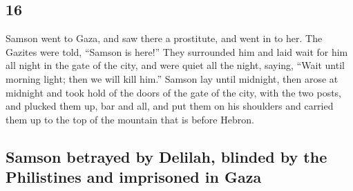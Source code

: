 \begin{paracol}{2}
\begin{otherlanguage}{english}
\hypertarget{section-31}{%
\section{16}\label{section-31}}

 Samson went to Gaza, and saw there a prostitute, and went
in to her.  The Gazites were told, ``Samson is here!''
They surrounded him and laid wait for him all night in the gate of the
city, and were quiet all the night, saying, ``Wait until morning light;
then we will kill him.''  Samson lay until midnight, then
arose at midnight and took hold of the doors of the gate of the city,
with the two posts, and plucked them up, bar and all, and put them on
his shoulders and carried them up to the top of the mountain that is
before Hebron.

\hypertarget{samson-betrayed-by-delilah-blinded-by-the-philistines-and-imprisoned-in-gaza}{%
\subsection{Samson betrayed by Delilah, blinded by the Philistines and
imprisoned in
Gaza}\label{samson-betrayed-by-delilah-blinded-by-the-philistines-and-imprisoned-in-gaza}}


\end{otherlanguage}
\end{paracol}
